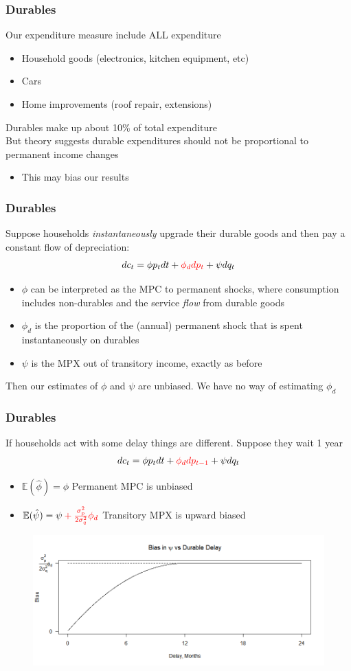 \documentclass{beamer}
\begin{document}
\frame
{
	\frametitle{Durables}
	Our expenditure measure include ALL expenditure
	\begin{itemize}
		\item Household goods (electronics, kitchen equipment, etc)
		\item Cars
		\item Home improvements (roof repair, extensions)
	\end{itemize}
	Durables make up about 10\% of total expenditure\\
	\pause
	\bigskip
	But theory suggests durable expenditures should not be proportional to permanent income changes 
	\begin{itemize}
		\item This may bias our results
	\end{itemize}
}
\frame
{
	\frametitle{Durables}
	Suppose households \textit{instantaneously} upgrade their durable goods and then pay a constant flow of depreciation:
	\begin{align*}
	dc_t = \phi p_t dt + \color{red} \phi_{d} dp_t \color{black} + \psi dq_t
	\end{align*}
	\begin{itemize}
		\item $\phi$ can be interpreted as the MP\color{red}C \color{black}to permanent shocks, where consumption includes non-durables and the service \textit{flow} from durable goods
		\item $\phi_{d}$ is the proportion of the (annual) permanent shock that is spent instantaneously on durables
		\item $\psi$ is the MPX out of transitory income, exactly as before
	\end{itemize}
	\pause
	Then our estimates of $\phi$ and $\psi$ are unbiased. We have no way of estimating $\phi_d$
}
\frame
{
	\frametitle{Durables}
	If households act with some delay things are different. Suppose they wait 1 year
	\begin{align*}
	dc_t = \phi p_t dt + \color{red} \phi_{d} dp_{t-1} \color{black} + \psi dq_t
	\end{align*}
	\begin{itemize}
		\item $\mathbb{E}(\hat{\phi})=\phi$ Permanent MPC is unbiased
		\item $\mathbb{E}(\hat{\psi})=\psi \color{red} + \frac{\sigma^2_p}{2\sigma^2_q}\phi_d$ Transitory MPX is upward biased
	\end{itemize}
	\begin{figure}
	\includegraphics[scale=0.3]{../Figures/DurableBias.png}
	\end{figure}
}
\end{document}
